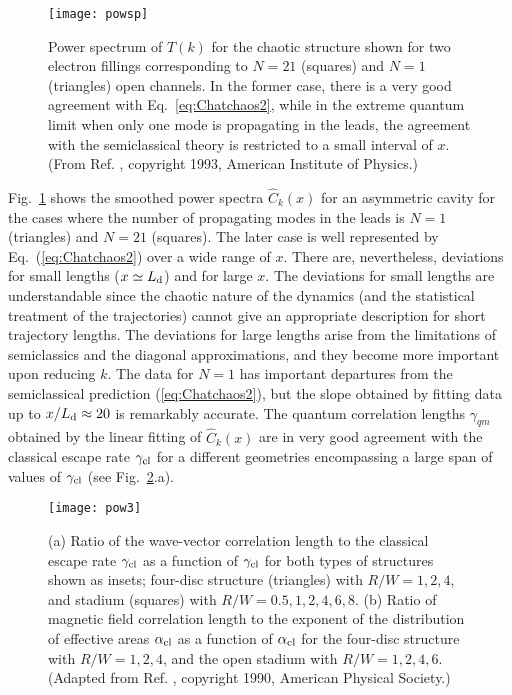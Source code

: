 \documentclass[a4paper,10pt]{article}
\newcommand{\nin}{\noindent}
\newcommand{\LD}{L_{\rm d}}
\newcommand{\gcl}{\gamma_{\rm cl}}
\newcommand{\alc}{\alpha_{\rm cl}}
\begin{document}
\begin{figure}
\setlength{\unitlength}{1mm}
\centerline{\texttt{[image: powsp]}}
\caption{
Power spectrum of $T(k)$ for the chaotic structure shown for two electron
fillings corresponding to $N\!=\!21$ (squares) and $N\!=\!1$ (triangles) open channels. In the former case, there is a very good agreement with Eq.~\protect\eqref{eq:Chatchaos2}, while in the extreme quantum limit
when only one mode is propagating in the leads, the agreement with the semiclassical theory is restricted to a small interval of $x$.  
(From Ref. \protect\cite{Chaost}, copyright 1993, American Institute of Physics.)
}
\label{fig:powsp}
\end{figure}

\nin Fig.~\ref{fig:powsp} shows the smoothed power spectra $\widehat{C}_k(x)$ for an asymmetric cavity for the cases where the number of propagating modes in the leads is $N=1$ (triangles) and $N=21$ (squares). The later case is  well represented by Eq.~(\ref{eq:Chatchaos2}) over a wide range of $x$. There are, nevertheless, deviations for small lengths ($x \simeq \LD$) and for large $x$. The deviations for small lengths are understandable since the chaotic nature of the dynamics (and the statistical treatment of the trajectories) cannot give an appropriate description for short trajectory lengths. The deviations for large lengths arise from the limitations of semiclassics and the diagonal approximations, and they become more important upon reducing $k$. The data for $N=1$ has important departures from the semiclassical prediction (\ref{eq:Chatchaos2}), but the slope obtained by fitting data up to $x/\LD \approx 20$ is remarkably accurate. The quantum correlation lengths $\gamma_{qm}$ obtained by the linear fitting of $\widehat{C}_k(x)$ are in very good agreement with the classical escape rate $\gcl$ for a different geometries encompassing a large span of values of $\gcl$ (see Fig.~\ref{fig:pow3}.a).  

\begin{figure}
\setlength{\unitlength}{1mm}
\centerline{\texttt{[image: pow3]}}
\caption{
(a) Ratio of the wave-vector correlation length to the classical escape rate $\gcl$ as a function of $\gcl$ for both types of structures shown as insets; four-disc structure (triangles) with $R/W=1,2,4$, and stadium (squares) with $R/W = 0.5,1,2,4,6,8$. (b) Ratio of magnetic field correlation length to the exponent of the distribution of effective areas $\alc$ as a function of $\alc$ for the four-disc structure with $R/W=1,2,4$, and the open stadium with $R/W = 1,2,4,6$. (Adapted from Ref. \protect\cite{Jal90}, copyright 1990, American Physical Society.)
}
\label{fig:pow3}
\end{figure}
\end{document}
